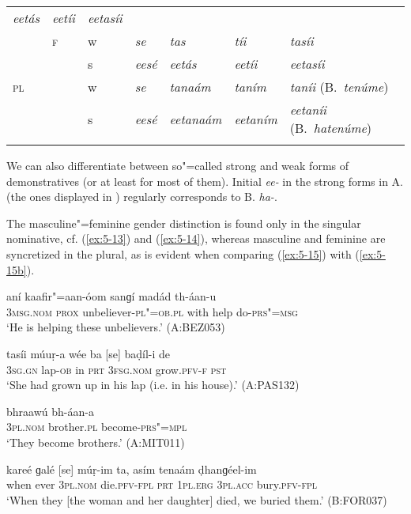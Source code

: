 \begin{table}[htp]
\begin{tabularx}{\textwidth}{ l l l Q Q Q P{23mm} }
\textit{eetás} &
\textit{eetíi} &
\textit{eetasíi} \\
&
\textsc{f} &
w &
\textit{se} &
\textit{tas} &
\textit{tíi} &
\textit{tasíi} \\
&
&
s &
\textit{eesé} &
\textit{eetás} &
\textit{eetíi} &
\textit{eetasíi} \\
\textsc{pl} &
&
w &
\textit{se} &
\textit{tanaám} &
\textit{taním} &
\textit{taníi} (B.~\textit{tenúme})\\
&
&
s &
\textit{eesé} &
\textit{eetanaám} &
\textit{eetaním} &
\textit{eetaníi} (B.~\textit{hatenúme})\\\lspbottomrule
\end{tabularx}
\label{tab:5-4}
\end{table}

We can also differentiate between so"=called strong and weak forms of demonstratives (or at least for most of them). Initial \textit{ee-} in the strong forms in A. (the ones displayed in ) regularly corresponds to B. \textit{ha-}. 

The masculine"=feminine gender distinction is found only in the singular nominative, cf. (\ref{ex:5-13}) and (\ref{ex:5-14}), whereas masculine and feminine are syncretized in the plural, as is evident when comparing (\ref{ex:5-15}) with (\ref{ex:5-15b}). 


\begin{exe}
\ex
\label{ex:5-13}
\gll [so] aní kaafir"=aan-óom sanɡí madád th-áan-u \\
\textsc{3msg}.\textsc{nom} \textsc{prox} unbeliever-\textsc{pl"=ob.pl} with help do-\textsc{prs"=msg}\\
\glt `He is helping these unbelievers.' (A:BEZ053)

\ex
\label{ex:5-14}
\gll tasíi múuṛ-a wée ba [se] baḍíl-i de \\
\textsc{3sg}.\textsc{gn} lap-\textsc{ob} in \textsc{prt} \textsc{3fsg}.\textsc{nom}
grow.\textsc{pfv-f} \textsc{pst}\\
\glt `She had grown up in his lap (i.e. in his house).' (A:PAS132)

\ex
\label{ex:5-15}
\gll [se] bhraawú bh-áan-a\\
\textsc{3pl}.\textsc{nom} brother.\textsc{pl} become-\textsc{prs"=mpl}\\
\glt `They become brothers.' (A:MIT011)

\ex
\label{ex:5-15b}
\gll kareé ɡalé [se] múṛ-im ta, asím  tenaám ḍhanɡéel-im\\
when ever \textsc{3pl.nom} die.\textsc{pfv}-\textsc{fpl} \textsc{prt} \textsc{1pl.erg} \textsc{3pl.acc} bury.\textsc{pfv}-\textsc{fpl} \\
\glt `When they [the woman and her daughter] died, we buried them.' (B:FOR037)
\end{exe}

